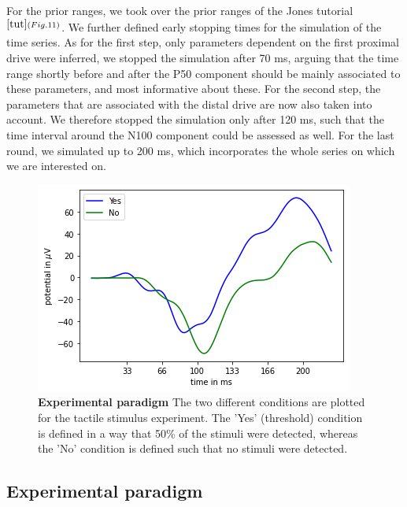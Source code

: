 \documentclass[12pt]{extreport}
\begin{document}
For the prior ranges, we took over the prior ranges of the Jones tutorial$^{\ref{tut}(Fig.11)}$.
We further defined early stopping times for the simulation of the time series. As for the first step, only parameters dependent on the first proximal drive were inferred, we stopped the simulation after 70 ms, arguing that the time range shortly before and after the P50 component should be mainly associated to these parameters, and most informative about these. 
For the second step, the parameters that are associated with the distal drive are now also taken into account. We therefore stopped the simulation only after 120 ms, such that the time interval around the N100 component could be assessed as well.
For the last round, we simulated up to 200 ms, which incorporates the whole series on which we are interested on. 


\begin{figure}[]
 \centering

        \includegraphics[width=0.50\linewidth]{images/thesis_fig3_3.png}
    
\caption{\label{experiment}\textbf{Experimental paradigm} \small The two different conditions are plotted for the tactile stimulus experiment. The 'Yes' (threshold) condition is defined in a way that 50\% of the stimuli were detected, whereas the 'No' condition is defined such that no stimuli were detected.}
  

\end{figure}

\subsection{Experimental paradigm}
\end{document}
